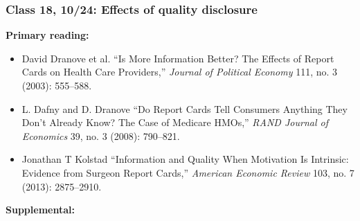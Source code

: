 \documentclass[11pt,]{article}
\providecommand{\tightlist}{%
  \setlength{\itemsep}{0pt}\setlength{\parskip}{0pt}}
\begin{document}
\hypertarget{class-18-1024-effects-of-quality-disclosure}{%
\subsubsection{Class 18, 10/24: Effects of quality
disclosure}\label{class-18-1024-effects-of-quality-disclosure}}

\textbf{Primary reading:}

\begin{itemize}
\tightlist
\item
  David Dranove et al. {``Is {More} {Information} {Better}? {The}
  {Effects} of {Report} {Cards} on {Health} {Care} {Providers},''}
  \emph{Journal of Political Economy} 111, no. 3 (2003): 555--588.
\item
  L. Dafny and D. Dranove {``Do Report Cards Tell Consumers Anything
  They Don't Already Know? {The} Case of {Medicare} {HMOs},''}
  \emph{RAND Journal of Economics} 39, no. 3 (2008): 790--821.
\item
  Jonathan T Kolstad {``Information and Quality When Motivation Is
  Intrinsic: {Evidence} from Surgeon Report Cards,''} \emph{American
  Economic Review} 103, no. 7 (2013): 2875--2910.
\end{itemize}

\textbf{Supplemental:}
\end{document}
